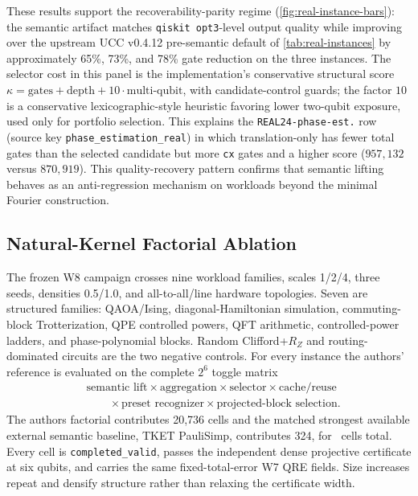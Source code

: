 \documentclass[aps,prx,reprint,floatfix,superscriptaddress]{revtex4-2}
\begin{document}
These results support the recoverability-parity regime
(\cref{fig:real-instance-bars}): the semantic artifact matches
\texttt{qiskit opt3}-level output quality while improving over the
upstream UCC v0.4.12 pre-semantic default of \cref{tab:real-instances} by
approximately 65\%, 73\%, and 78\% gate reduction on the three instances.
The selector cost in this panel is the implementation's conservative
structural score $\kappa = \text{gates} + \text{depth} +
10\cdot\text{multi-qubit}$, with candidate-control guards; the factor
$10$ is a conservative lexicographic-style heuristic favoring lower
two-qubit exposure, used only for portfolio selection. This explains the
\texttt{REAL24-phase-est.} row (source key
\texttt{phase\_estimation\_real}) in which translation-only has fewer
total gates than the selected candidate but more \texttt{cx} gates and a
higher score ($957{,}132$ versus $870{,}919$). This quality-recovery
pattern confirms that semantic lifting behaves as an anti-regression
mechanism on workloads beyond the minimal Fourier construction.

\subsection{Natural-Kernel Factorial Ablation}
\label{sec:natural-factorial}

The frozen W8 campaign crosses nine workload families, scales 1/2/4, three
seeds, densities 0.5/1.0, and all-to-all/line hardware topologies.  Seven are
structured families: QAOA/Ising, diagonal-Hamiltonian simulation,
commuting-block Trotterization, QPE controlled powers, QFT arithmetic,
controlled-power ladders, and phase-polynomial blocks.  Random
Clifford+$R_Z$ and routing-dominated circuits are the two negative controls.
For every instance the authors' reference is evaluated on the complete
$2^6$ toggle matrix
\begin{equation*}
\begin{split}
&\text{semantic lift}\times\text{aggregation}\times\text{selector}
\times\text{cache/reuse}\\
&\qquad\times\text{preset recognizer}
\times\text{projected-block selection}.
\end{split}
\end{equation*}
The authors factorial contributes 20,736 cells and the matched strongest
available external semantic baseline, TKET PauliSimp, contributes 324, for
\NaturalCells\ cells total.  Every cell is \texttt{completed\_valid}, passes
the independent dense projective certificate at six qubits, and carries the
same fixed-total-error W7 QRE fields.  Size increases repeat and densify
structure rather than relaxing the certificate width.
\end{document}
